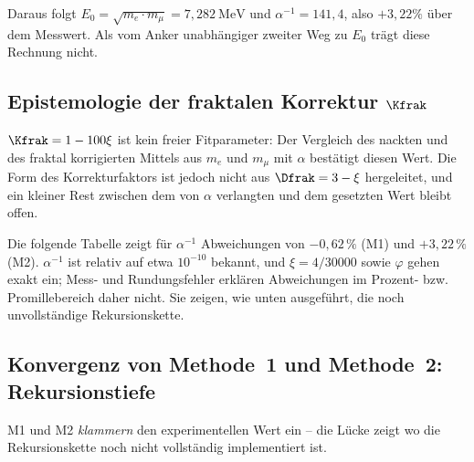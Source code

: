Daraus folgt $E_0 = \sqrt{m_e \cdot m_\mu} = 7{,}282\ \text{MeV}$ und $\alpha^{-1} = 141{,}4$, also $+3{,}22\%$ über dem Messwert. Als vom Anker unabhängiger zweiter Weg zu $E_0$ trägt diese Rechnung nicht.

\subsection{Epistemologie der fraktalen Korrektur $\Kfrak$}

$\Kfrak = 1 - 100\xi$ ist kein freier Fitparameter: Der Vergleich des nackten und des fraktal korrigierten Mittels aus $m_e$ und $m_\mu$ mit $\alpha$ bestätigt diesen Wert. Die Form des Korrekturfaktors ist jedoch nicht aus $\Dfrak = 3 - \xi$ hergeleitet, und ein kleiner Rest zwischen dem von $\alpha$ verlangten und dem gesetzten Wert bleibt offen.

\begin{keyresult}
Die folgende Tabelle zeigt für $\alpha^{-1}$ Abweichungen von $-0{,}62\,\%$ (M1) und $+3{,}22\,\%$ (M2). $\alpha^{-1}$ ist relativ auf etwa $10^{-10}$ bekannt, und $\xi = 4/30000$ sowie $\varphi$ gehen exakt ein; Mess- und Rundungsfehler erklären Abweichungen im Prozent- bzw. Promillebereich daher nicht. Sie zeigen, wie unten ausgeführt, die noch unvollständige Rekursionskette.
\end{keyresult}

\subsection{Konvergenz von Methode~1 und Methode~2: Rekursionstiefe}

\begin{center}
\end{center}

M1 und M2 \emph{klammern} den experimentellen Wert ein -- die Lücke zeigt wo die Rekursionskette noch nicht vollständig implementiert ist.

